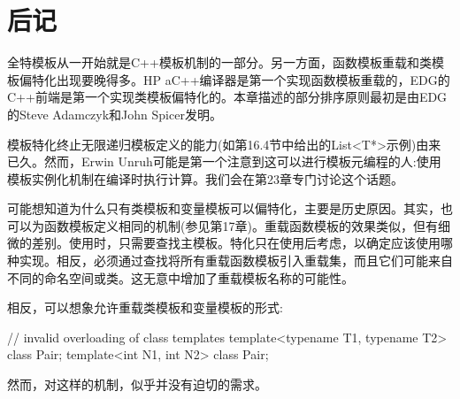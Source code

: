 \section{后记}
全特模板从一开始就是C++模板机制的一部分。另一方面，函数模板重载和类模板偏特化出现要晚得多。HP aC++编译器是第一个实现函数模板重载的，EDG的C++前端是第一个实现类模板偏特化的。本章描述的部分排序原则最初是由EDG的Steve Adamczyk和John Spicer发明。

模板特化终止无限递归模板定义的能力(如第16.4节中给出的List<T*>示例)由来已久。然而，Erwin Unruh可能是第一个注意到这可以进行模板元编程的人:使用模板实例化机制在编译时执行计算。我们会在第23章专门讨论这个话题。

可能想知道为什么只有类模板和变量模板可以偏特化，主要是历史原因。其实，也可以为函数模板定义相同的机制(参见第17章)。重载函数模板的效果类似，但有细微的差别。使用时，只需要查找主模板。特化只在使用后考虑，以确定应该使用哪种实现。相反，必须通过查找将所有重载函数模板引入重载集，而且它们可能来自不同的命名空间或类。这无意中增加了重载模板名称的可能性。

相反，可以想象允许重载类模板和变量模板的形式:

\begin{cpp}
// invalid overloading of class templates
template<typename T1, typename T2> class Pair;
template<int N1, int N2> class Pair;
\end{cpp}

然而，对这样的机制，似乎并没有迫切的需求。